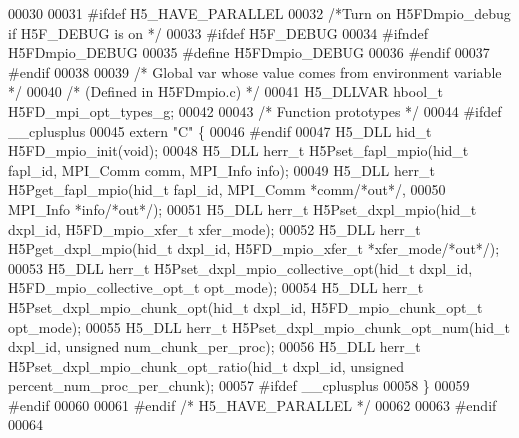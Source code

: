 \begin{DoxyCode}
00030 
00031 \textcolor{preprocessor}{#ifdef H5\_HAVE\_PARALLEL}
00032 \textcolor{comment}{/*Turn on H5FDmpio\_debug if H5F\_DEBUG is on */}
00033 \textcolor{preprocessor}{#ifdef H5F\_DEBUG}
00034 \textcolor{preprocessor}{#ifndef H5FDmpio\_DEBUG}
00035 \textcolor{preprocessor}{#define H5FDmpio\_DEBUG}
00036 \textcolor{preprocessor}{#endif}
00037 \textcolor{preprocessor}{#endif}
00038 
00039 \textcolor{comment}{/* Global var whose value comes from environment variable */}
00040 \textcolor{comment}{/* (Defined in H5FDmpio.c) */}
00041 H5\_DLLVAR hbool\_t H5FD\_mpi\_opt\_types\_g;
00042 
00043 \textcolor{comment}{/* Function prototypes */}
00044 \textcolor{preprocessor}{#ifdef \_\_cplusplus}
00045 \textcolor{keyword}{extern} \textcolor{stringliteral}{"C"} \{
00046 \textcolor{preprocessor}{#endif}
00047 H5\_DLL hid\_t H5FD\_mpio\_init(\textcolor{keywordtype}{void});
00048 H5\_DLL herr\_t H5Pset\_fapl\_mpio(hid\_t fapl\_id, MPI\_Comm comm, MPI\_Info info);
00049 H5\_DLL herr\_t H5Pget\_fapl\_mpio(hid\_t fapl\_id, MPI\_Comm *comm\textcolor{comment}{/*out*/},
00050             MPI\_Info *info\textcolor{comment}{/*out*/});
00051 H5\_DLL herr\_t H5Pset\_dxpl\_mpio(hid\_t dxpl\_id, H5FD\_mpio\_xfer\_t xfer\_mode);
00052 H5\_DLL herr\_t H5Pget\_dxpl\_mpio(hid\_t dxpl\_id, H5FD\_mpio\_xfer\_t *xfer\_mode\textcolor{comment}{/*out*/});
00053 H5\_DLL herr\_t H5Pset\_dxpl\_mpio\_collective\_opt(hid\_t dxpl\_id, H5FD\_mpio\_collective\_opt\_t opt\_mode);
00054 H5\_DLL herr\_t H5Pset\_dxpl\_mpio\_chunk\_opt(hid\_t dxpl\_id, H5FD\_mpio\_chunk\_opt\_t opt\_mode);
00055 H5\_DLL herr\_t H5Pset\_dxpl\_mpio\_chunk\_opt\_num(hid\_t dxpl\_id, \textcolor{keywordtype}{unsigned} num\_chunk\_per\_proc);
00056 H5\_DLL herr\_t H5Pset\_dxpl\_mpio\_chunk\_opt\_ratio(hid\_t dxpl\_id, \textcolor{keywordtype}{unsigned} percent\_num\_proc\_per\_chunk);
00057 \textcolor{preprocessor}{#ifdef \_\_cplusplus}
00058 \}
00059 \textcolor{preprocessor}{#endif}
00060 
00061 \textcolor{preprocessor}{#endif }\textcolor{comment}{/* H5\_HAVE\_PARALLEL */}\textcolor{preprocessor}{}
00062 
00063 \textcolor{preprocessor}{#endif}
00064 
\end{DoxyCode}
